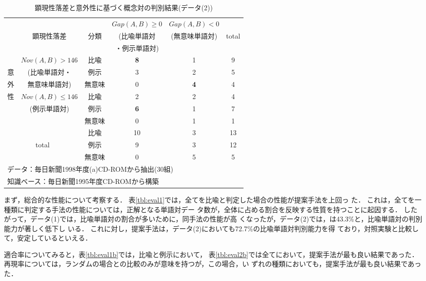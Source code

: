 \begin{table}[tb]
  \begin{center}
     \caption{顕現性落差と意外性に基づく概念対の判別結果(データ(2))}
     \label{tbl:eval2}
\begin{tabular}{|c|c|c|c|c||c|}
\hline
   &		  &	&$Gap(A,B){\geq}0$ & $Gap(A,B)<0$&\\
   &{顕現性落差}&{分類}&(比喩単語対	&(無意味単語対)	&total\\
   &		&	&・例示単語対)	&	&\\
\hline
   \cline{2-6}
   & $Nov(A,B)>146$& 比喩     &{\bf 8}	&1	&9 \\
         \cline{3-6}
意 & (比喩単語対・	& 例示&3	&2	&5 \\	
         \cline{3-6}
外 & 無意味単語対) 	& 無意味&0	&{\bf 4}&4 \\
   \cline{2-6}
性 & $Nov(A,B){\leq}146$& 比喩  &2	&2	&4\\
         \cline{3-6}
   & (例示単語対)	&例示&{\bf 6}&1	&7\\
         \cline{3-6}
   &	& 無意味 	&0	&1	&1 \\
\hline
\hline
\multicolumn{2}{|c|}{}
	& 比喩		&10	&3	&13\\
         \cline{3-6}
\multicolumn{2}{|c|}{total}
	& 例示		&9	&3	&12\\
         \cline{3-6}
\multicolumn{2}{|c|}{}
	& 無意味	&0	&5	&5\\
\hline
\multicolumn{5}{l}{データ：毎日新聞1998年度(a)CD-ROMから抽出(30組)}\\
\multicolumn{5}{l}{知識ベース：毎日新聞1995年度CD-ROMから構築}\\
\end{tabular}
\end{center}
\end{table}

まず，総合的な性能について考察する．
表\ref{tbl:eval1}では，全てを比喩と判定した場合の性能が提案手法を上回っ
た．
これは，全てを一種類に判定する手法の性能については，正解となる単語対デー
タ数が，全体に占める割合を反映する性質を持つことに起因する．
したがって，データ(1)では，比喩単語対の割合が多いために，同手法の性能が高
くなったが，データ(2)では，は43.3\%と，比喩単語対の判別能力が著しく低下し
いる．
これに対し，提案手法は，データ(2)においても72.7\%の比喩単語対判別能力を得
ており，対照実験と比較して，安定しているといえる．

適合率についてみると，表\ref{tbl:eval1b}では，比喩と例示において，
表\ref{tbl:eval2b}では全てにおいて，提案手法が最も良い結果であった．
再現率については，ランダムの場合との比較のみが意味を持つが，この場合，い
ずれの種類においても，提案手法が最も良い結果であった．

